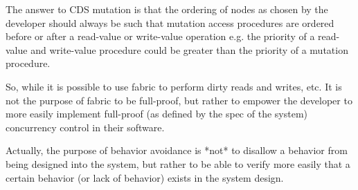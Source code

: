The answer to CDS mutation is that the ordering of nodes as chosen by the developer should always be such that mutation access procedures are ordered before or after a read-value or write-value operation e.g. the priority of a read-value and write-value procedure could be greater than the priority of a mutation procedure.

So, while it is possible to use fabric to perform dirty reads and writes, etc. It is not the purpose of fabric to be full-proof, but rather to empower the developer to more easily implement full-proof (as defined by the spec of the system) concurrency control in their software.

Actually, the purpose of behavior avoidance is *not* to disallow a behavior from being designed into the system, but rather to be able to verify more easily that a certain behavior (or lack of behavior) exists in the system design.
